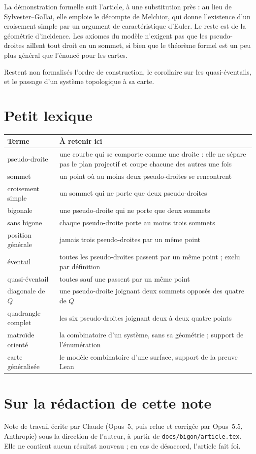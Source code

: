 \documentclass[11pt,a4paper]{amsart}
\theoremstyle{definition}
\theoremstyle{plain}
\theoremstyle{remark}
\begin{document}
La démonstration formelle suit l'article, à une substitution près : au lieu de Sylvester--Gallai, elle emploie le décompte de Melchior, qui donne l'existence d'un croisement simple par un argument de caractéristique d'Euler. Le reste est de la géométrie d'incidence. Les axiomes du modèle n'exigent pas que les pseudo-droites aillent tout droit en un sommet, si bien que le théorème formel est un peu plus général que l'énoncé pour les cartes.

Restent non formalisés l'ordre de construction, le corollaire sur les quasi-éventails, et le passage d'un système topologique à sa carte.

\section{Petit lexique}

\begin{tabular}{@{}p{3.6cm}p{10.2cm}@{}}
\toprule
Terme & À retenir ici \\
\midrule
pseudo-droite & une courbe qui se comporte comme une droite : elle ne sépare pas le plan projectif et coupe chacune des autres une fois \\[2pt]
sommet & un point où au moins deux pseudo-droites se rencontrent \\
croisement simple & un sommet qui ne porte que deux pseudo-droites \\
bigonale & une pseudo-droite qui ne porte que deux sommets \\
sans bigone & chaque pseudo-droite porte au moins trois sommets \\
position générale & jamais trois pseudo-droites par un même point \\[2pt]
éventail & toutes les pseudo-droites passent par un même point ; exclu par définition \\[2pt]
quasi-éventail & toutes sauf une passent par un même point \\
diagonale de $Q$ & une pseudo-droite joignant deux sommets opposés des quatre de $Q$ \\[2pt]
quadrangle complet & les six pseudo-droites joignant deux à deux quatre points \\
matroïde orienté & la combinatoire d'un système, sans sa géométrie ; support de l'énumération \\[2pt]
carte généralisée & le modèle combinatoire d'une surface, support de la preuve Lean \\
\bottomrule
\end{tabular}

\section*{Sur la rédaction de cette note}

Note de travail écrite par Claude (Opus~5, puis relue et corrigée par Opus~5.5, Anthropic) sous la direction de l'auteur, à partir de \texttt{docs/bigon/article.tex}. Elle ne contient aucun résultat nouveau ; en cas de désaccord, l'article fait foi.
\end{document}
